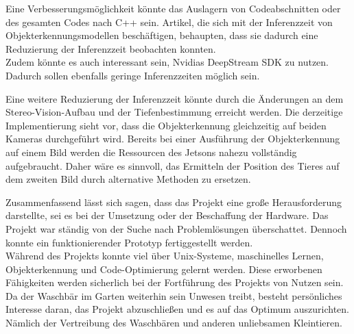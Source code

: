 Eine Verbesserungsmöglichkeit könnte das Auslagern von Codeabschnitten oder des gesamten Codes nach C++ sein. Artikel, die sich mit der Inferenzzeit von Objekterkennungsmodellen beschäftigen, behaupten, dass sie dadurch eine Reduzierung der Inferenzzeit beobachten konnten.
\\
Zudem könnte es auch interessant sein, Nvidias DeepStream SDK zu nutzen. Dadurch sollen ebenfalls geringe Inferenzzeiten möglich sein.

Eine weitere Reduzierung der Inferenzzeit könnte durch die Änderungen an dem Stereo-Vision-Aufbau und der Tiefenbestimmung erreicht werden. Die derzeitige Implementierung sieht vor, dass die Objekterkennung gleichzeitig auf beiden Kameras durchgeführt wird. Bereits bei einer Ausführung der Objekterkennung auf einem Bild werden die Ressourcen des Jetsons nahezu vollständig aufgebraucht. Daher wäre es sinnvoll, das Ermitteln der Position des Tieres auf dem zweiten Bild durch alternative Methoden zu ersetzen.

Zusammenfassend lässt sich sagen, dass das Projekt eine große Herausforderung darstellte, sei es bei der Umsetzung oder der Beschaffung der Hardware. Das Projekt war ständig von der Suche nach Problemlösungen überschattet. Dennoch konnte ein funktionierender Prototyp fertiggestellt werden.\\
Während des Projekts konnte viel über Unix-Systeme, maschinelles Lernen, Objekterkennung und Code-Optimierung gelernt werden. Diese erworbenen Fähigkeiten werden sicherlich bei der Fortführung des Projekts von Nutzen sein. Da der Waschbär im Garten weiterhin sein Unwesen treibt, besteht persönliches Interesse daran, das Projekt abzuschließen und es auf das Optimum auszurichten. Nämlich der Vertreibung des Waschbären und anderen unliebsamen Kleintieren.
